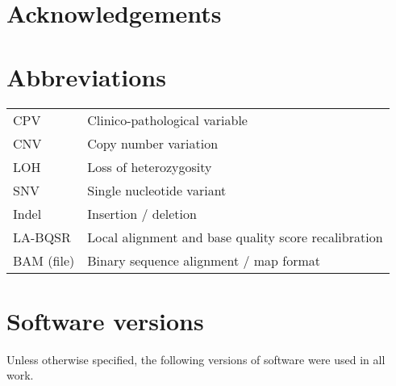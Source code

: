 \documentclass[a4paper]{report}
\begin{document}
\title{}
\author{Mark Pinese}
\date{}

\maketitle

\tableofcontents
\listoffigures
\listoftables

\chapter*{Acknowledgements}

\begin{abstract}
\end{abstract}


\chapter*{Abbreviations}

\begin{tabular}[c]{ l | l }
  CPV           & Clinico-pathological variable \\
  CNV           & Copy number variation \\
  LOH           & Loss of heterozygosity \\
  SNV           & Single nucleotide variant \\
  Indel         & Insertion / deletion \\
  LA-BQSR       & Local alignment and base quality score recalibration \\
  BAM (file)    & Binary sequence alignment / map format \\
\end{tabular}


\chapter*{Software versions}
Unless otherwise specified, the following versions of software were used in all work.
\end{document}
